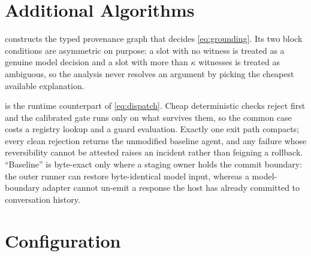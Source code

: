 \section{Additional Algorithms}
\label{app:algorithms}




 constructs the typed provenance graph that decides
\cref{eq:grounding}. Its two block conditions are asymmetric on purpose: a slot
with no witness is treated as a genuine model decision and a slot with more
than $\kappa$ witnesses is treated as ambiguous, so the analysis never resolves
an argument by picking the cheapest available explanation.

 is the runtime counterpart of \cref{eq:dispatch}. Cheap
deterministic checks reject first and the calibrated gate runs only on what
survives them, so the common case costs a registry lookup and a guard
evaluation. Exactly one exit path compacts; every clean rejection returns the
unmodified baseline agent, and any failure whose reversibility cannot be
attested raises an incident rather than feigning a rollback. ``Baseline'' is
byte-exact only where a staging owner holds
the commit boundary: the outer runner can restore byte-identical model input,
whereas a model-boundary adapter cannot un-emit a response the host has already
committed to conversation history.

\section{Configuration}
\label{app:config}

